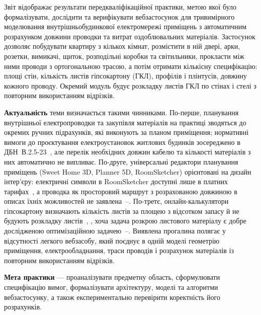 
Звіт відображає результати передкваліфікаційної практики, метою якої було формалізувати, дослідити та верифікувати вебзастосунок для тривимірного моделювання внутрішньобудинкової електромережі приміщень з автоматичним розрахунком довжини проводки та витрат оздоблювальних матеріалів. Застосунок дозволяє побудувати квартиру з кількох кімнат, розмістити в ній двері, арки, розетки, вимикачі, щиток, розподільні коробки та світильники, прокласти між ними проводи з ортогональною трасою, а потім отримати кількісну специфікацію: площі стін, кількість листів гіпсокартону (ГКЛ), профілів і плінтусів, довжину кожного проводу. Окремий модуль будує розкладку листів ГКЛ по стінах і стелі з повторним використанням відрізків.

\textbf{Актуальність} теми визначається такими чинниками. По-перше, планування внутрішньої електропроводки та закупівля матеріалів на практиці зводяться до окремих ручних підрахунків, які виконують за планом приміщення; нормативні вимоги до проєктування електроустановок житлових будинків зосереджено в ДБН~В.2.5-23~, але перелік необхідних довжин кабелю та кількості матеріалів з них автоматично не випливає. По-друге, універсальні редактори планування приміщень (Sweet Home 3D, Planner 5D, RoomSketcher) орієнтовані на дизайн інтер'єру: електричні символи в RoomSketcher доступні лише в платних тарифах~, а проводка як просторовий маршрут з розрахованою довжиною в описах їхніх можливостей не заявлена~--. По-третє, онлайн-калькулятори гіпсокартону визначають кількість листів за площею з відсотком запасу й не будують розкладку листів~, , хоча задача розкрою листового матеріалу є добре дослідженою оптимізаційною задачею~--. Виявлена прогалина полягає у відсутності легкого вебзасобу, який поєднує в одній моделі геометрію приміщення, електрообладнання, траси проводів і розрахунок матеріалів із повторним використанням відрізків.

\textbf{Мета практики} --- проаналізувати предметну область, сформулювати специфікацію вимог, формалізувати архітектуру, моделі та алгоритми вебзастосунку, а також експериментально перевірити коректність його розрахунків.

